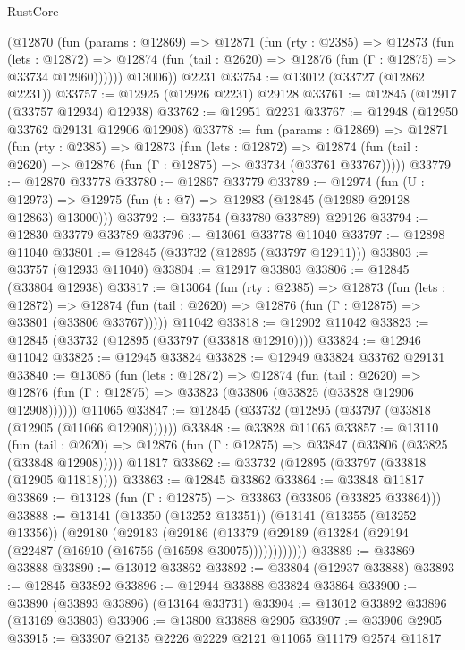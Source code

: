 \begin{lexlean}{RustCore}
\begin{coremodule}
        (@12870
          (fun (params : @12869) =>
          @12871
            (fun (rty : @2385) =>
            @12873
              (fun (lets : @12872) =>
              @12874 (fun (tail : @2620) => @12876 (fun (Γ : @12875) => @33734 @12960))))))
        @13006))
    @2231
@33754 := @13012 (@33727 (@12862 @2231))
@33757 := @12925 (@12926 @2231) @29128
@33761 := @12845 (@12917 (@33757 @12934) @12938)
@33762 := @12951 @2231
@33767 := @12948 (@12950 @33762 @29131 @12906 @12908)
@33778 := fun (params : @12869) =>
  @12871
    (fun (rty : @2385) =>
    @12873
      (fun (lets : @12872) =>
      @12874 (fun (tail : @2620) => @12876 (fun (Γ : @12875) => @33734 (@33761 @33767)))))
@33779 := @12870 @33778
@33780 := @12867 @33779
@33789 := @12974
    (fun (U : @12973) => @12975 (fun (t : @7) => @12983 (@12845 (@12989 @29128 @12863) @13000)))
@33792 := @33754 (@33780 @33789) @29126
@33794 := @12830 @33779 @33789
@33796 := @13061 @33778 @11040
@33797 := @12898 @11040
@33801 := @12845 (@33732 (@12895 (@33797 @12911)))
@33803 := @33757 (@12933 @11040)
@33804 := @12917 @33803
@33806 := @12845 (@33804 @12938)
@33817 := @13064
    (fun (rty : @2385) =>
    @12873
      (fun (lets : @12872) =>
      @12874 (fun (tail : @2620) => @12876 (fun (Γ : @12875) => @33801 (@33806 @33767)))))
    @11042
@33818 := @12902 @11042
@33823 := @12845 (@33732 (@12895 (@33797 (@33818 @12910))))
@33824 := @12946 @11042
@33825 := @12945 @33824
@33828 := @12949 @33824 @33762 @29131
@33840 := @13086
    (fun (lets : @12872) =>
    @12874
      (fun (tail : @2620) =>
      @12876 (fun (Γ : @12875) => @33823 (@33806 (@33825 (@33828 @12906 @12908))))))
    @11065
@33847 := @12845 (@33732 (@12895 (@33797 (@33818 (@12905 (@11066 @12908))))))
@33848 := @33828 @11065
@33857 := @13110
    (fun (tail : @2620) => @12876 (fun (Γ : @12875) => @33847 (@33806 (@33825 (@33848 @12908)))))
    @11817
@33862 := @33732 (@12895 (@33797 (@33818 (@12905 @11818))))
@33863 := @12845 @33862
@33864 := @33848 @11817
@33869 := @13128 (fun (Γ : @12875) => @33863 (@33806 (@33825 @33864)))
@33888 := @13141
    (@13350 (@13252 @13351))
    (@13141
      (@13355 (@13252 @13356))
      (@29180
        (@29183
          (@29186 (@13379 (@29189 (@13284 (@29194 (@22487 (@16910 (@16756 (@16598 @30075))))))))))))
@33889 := @33869 @33888
@33890 := @13012 @33862
@33892 := @33804 (@12937 @33888)
@33893 := @12845 @33892
@33896 := @12944 @33888 @33824 @33864
@33900 := @33890 (@33893 @33896) (@13164 @33731)
@33904 := @13012 @33892 @33896 (@13169 @33803)
@33906 := @13800 @33888 @2905
@33907 := @33906 @2905
@33915 := @33907 @2135 @2226 @2229 @2121 @11065 @11179 @2574 @11817

\end{coremodule}
\end{lexlean}
